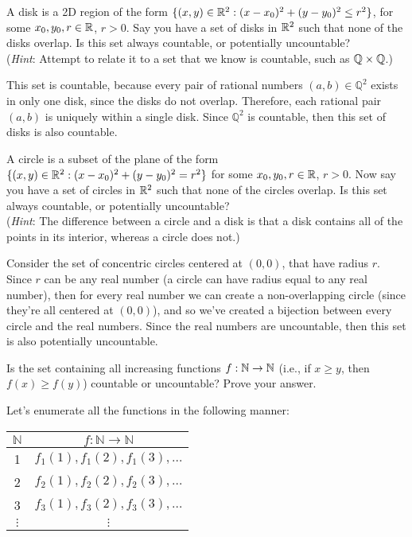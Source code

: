\documentclass[11pt]{article}
\begin{document}
\begin{Parts}
    \Part
    A disk is a 2D region of the form $\{(x, y) \in \mathbb{R}^2 : (x - x_0)^2 + (y - y_0)^2 \le r^2\}$, for some $x_0, y_0, r \in \mathbb{R}$, $r > 0$.
    Say you have a set of disks in $\mathbb{R}^2$ such that none of the disks overlap.
    Is this set always countable, or potentially uncountable?\\
    (\textit{Hint}: Attempt to relate it to a set that we know is countable, such as $\mathbb{Q} \times \mathbb{Q}$.)

    \begin{solution}
      This set is countable, because every pair of rational numbers $(a, b) \in \mathbb Q^2$ exists in only one disk, since the disks do not overlap. Therefore, each rational pair $(a, b)$ is uniquely within a single disk. Since $\mathbb Q^2$ is countable, then this set of disks is also countable.
    \end{solution}
    
    \Part
    A circle is a subset of the plane of the form $\{(x, y) \in \mathbb{R}^2 : (x - x_0)^2 + (y - y_0)^2 = r^2\}$ for some $x_0, y_0, r \in \mathbb{R}$, $r > 0$. 
    Now say you have a set of circles in $\mathbb{R}^2$ such that none of the circles overlap.
    Is this set always countable, or potentially uncountable?\\
    (\textit{Hint}: The difference between a circle and a disk is that a disk contains all of the points in its interior, whereas a circle does not.)
    
    \begin{solution}
      Consider the set of concentric circles centered at $(0, 0)$, that have radius $r$. Since $r$ can be any real number (a circle can have radius equal to any real number), then for every real number we can create a non-overlapping circle (since they're all centered at $(0, 0)$), and so we've created a bijection between every circle and the real numbers. Since the real numbers are uncountable, then this set is also potentially uncountable.
    \end{solution}
    
    \Part
    Is the set containing all increasing functions $f : \mathbb{N} \rightarrow \mathbb{N}$ (i.e., if $x \geq y $, then $f(x) \geq f(y)$) countable or uncountable? Prove your answer.

    \begin{solution}
      Let's enumerate all the functions in the following manner: 

      \begin{center}
        \begin{tabular}{c|c}
          $\mathbb N$ & $f: \mathbb N \to \mathbb N$    \\ \hline
          1                          & $f_1(1), f_1(2), f_1(3), \dots$ \\
          2                          & $f_2(1), f_2(2), f_2(3), \dots$ \\
          3                          & $f_3(1), f_3(2), f_3(3), \dots$ \\
          $\vdots$                   & $\vdots$                       
          \end{tabular}
      \end{center}


\end{solution}
\end{Parts}
\end{document}
